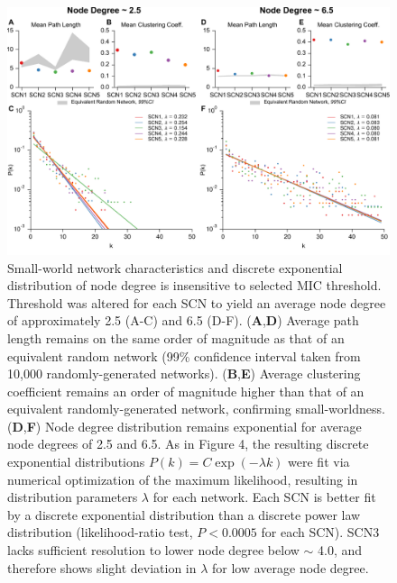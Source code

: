 \begin{figure}[p]
    \begin{center}
        \includegraphics[width=6.5in]{chap3/figures/s5.pdf}
    \end{center}
    \caption{\label{fig:s5} Small-world network characteristics and discrete exponential distribution of node degree is insensitive to selected MIC threshold. Threshold was altered for each SCN to yield an average node degree of approximately 2.5 (A-C) and 6.5 (D-F). (\textbf{A},\textbf{D}) Average path length remains on the same order of magnitude as that of an equivalent random network (99\% confidence interval taken from 10,000 randomly-generated networks). (\textbf{B},\textbf{E}) Average clustering coefficient remains an order of magnitude higher than that of an equivalent randomly-generated network, confirming small-worldness. (\textbf{D},\textbf{F}) Node degree distribution remains exponential for average node degrees of 2.5 and 6.5. As in Figure 4, the resulting discrete exponential distributions $P(k) = C\exp(-\lambda k)$ were fit via numerical optimization of the maximum likelihood, resulting in distribution parameters $\lambda$ for each network. Each SCN is better fit by a discrete exponential distribution than a discrete power law distribution (likelihood-ratio test, $P<0.0005$ for each SCN). SCN3 lacks sufficient resolution to lower node degree below $\sim$ 4.0, and therefore shows slight deviation in $\lambda$ for low average node degree.
}
\end{figure}




